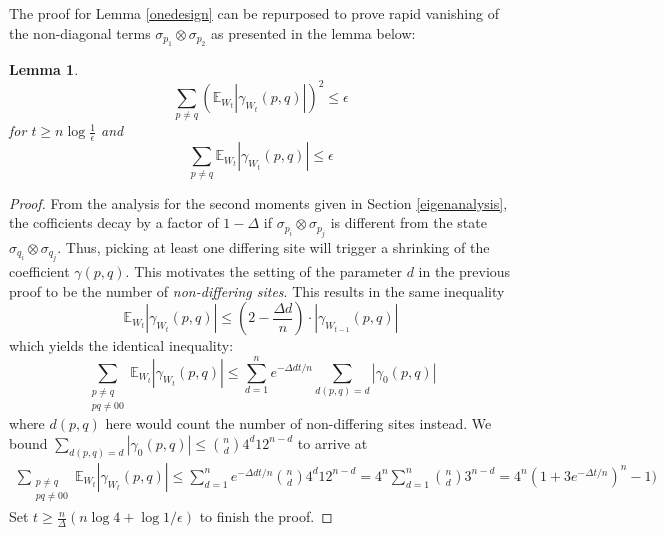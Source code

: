 \documentclass[12pt]{amsart}
\newtheorem{lemma}[theorem]{Lemma}
\theoremstyle{definition}
\theoremstyle{remark}
\numberwithin{equation}{section}
\theoremstyle{remark}
\begin{document}
%
The proof for Lemma \ref{onedesign} can be repurposed to prove rapid vanishing of the non-diagonal terms $\sigma_{p_1} \otimes \sigma_{p_2}$ as presented in the lemma below:
%
\begin{lemma}
  \begin{equation}
     \sum_{p \neq q} \left( \mathbb{E}_{W_t} |\gamma_{W_t}(p,q)|\right)^2 \leq \epsilon
  \end{equation}
  for $t \geq n\log\frac{1}{\epsilon}$
  and
  \begin{equation}
    \sum_{p \neq q}  \mathbb{E}_{W_t} |\gamma_{W_t}(p,q)| \leq \epsilon
  \end{equation}
\end{lemma}
%
\begin{proof}
  From the analysis for the second moments given in Section \ref{eigenanalysis}, the cofficients decay by a factor of $1- \Delta$ if $\sigma_{p_{i}} \otimes \sigma_{p_{j}}$ is different from the state $\sigma_{q_{i}} \otimes \sigma_{q_{j}}$. Thus, picking at least one differing site will trigger a shrinking of the coefficient $\gamma(p,q)$. This motivates the setting of the parameter $d$ in the previous proof to be the number of \emph{non-differing sites}. This results in the same inequality
  $$ \mathbb{E}_{W_t}|\gamma_{W_t}(p,q)| \leq \left(2 - \frac{\Delta d}{n} \right)\cdot |\gamma_{W_{t-1}}(p,q)|$$
  which yields the identical inequality:
  \begin{equation*}
    \sum_{\substack{p \neq q \\ pq \neq 00}} \mathbb{E}_{W_t}|\gamma_{W_t}(p,q)| \leq \sum_{d = 1}^n e^{-\Delta d t/n} \sum_{d(p,q) = d} |\gamma_0(p,q)|
  \end{equation*}
  where $d(p,q)$ here would count the number of non-differing sites instead. We bound $\sum_{d(p,q) = d} |\gamma_0(p,q)| \leq {n \choose d} 4^d12^{n-d}$ to arrive at
  \begin{align*}
    \sum_{\substack{p \neq q \\ pq \neq 00}} \mathbb{E}_{W_t}|\gamma_{W_t}(p,q)| \leq \sum_{d = 1}^n e^{-\Delta d t/n} {n \choose d} 4^d12^{n-d} =  4^n \sum_{d = 1}^n{n \choose d} 3^{n-d} = 4^n(1 + 3e^{-\Delta t/n})^n -1)
  \end{align*}
  Set $t \geq \frac{n}{\Delta}(n\log{4} + \log{1/\epsilon})$ to finish the proof.
\end{proof}
%
\end{document}
